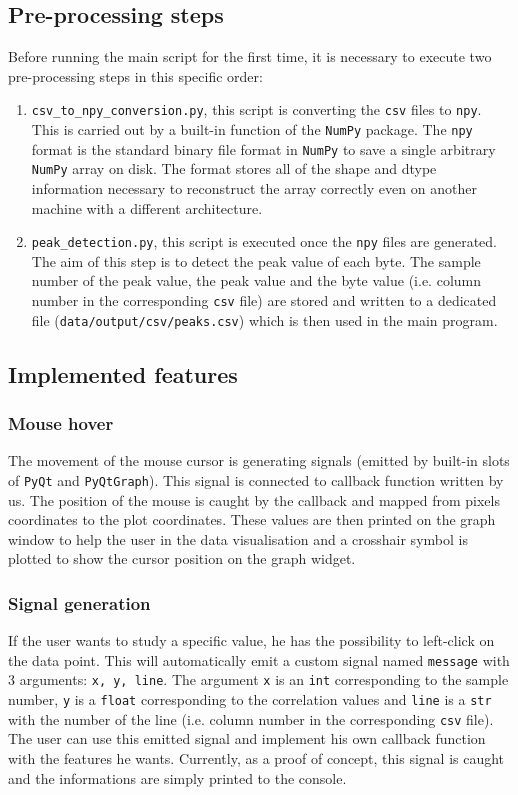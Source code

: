 \documentclass[11pt,a4paper]{article}
\begin{document}
\subsection{Pre-processing steps}
Before running the main script for the first time, it is necessary to execute two pre-processing steps in this specific order:
\begin{enumerate}
    \item \texttt{csv\_to\_npy\_conversion.py}, this script is converting the \texttt{csv} files to \texttt{npy}. This is carried out by a built-in function of the \texttt{NumPy} package. The \texttt{npy} format is the standard binary file format in \texttt{NumPy} to save a single arbitrary \texttt{NumPy} array on disk. The format stores all of the shape and dtype information necessary to reconstruct the array correctly even on another machine with a different architecture.
    \item \texttt{peak\_detection.py}, this script is executed once the \texttt{npy} files are generated. The aim of this step is to detect the peak value of each byte. The sample number of the peak value, the peak value and the byte value (i.e. column number in the corresponding \texttt{csv} file) are stored and written to a dedicated file (\texttt{data/output/csv/peaks.csv}) which is then used in the main program.
\end{enumerate}

\subsection{Implemented features}
\subsubsection{Mouse hover}
The movement of the mouse cursor is generating signals (emitted by built-in slots of \texttt{PyQt} and \texttt{PyQtGraph}). This signal is connected to callback function written by us. The position of the mouse is caught by the callback and mapped from pixels coordinates to the plot coordinates. These values are then printed on the graph window to help the user in the data visualisation and a crosshair symbol is plotted to show the cursor position on the graph widget.

\subsubsection{Signal generation}
If the user wants to study a specific value, he has the possibility to left-click on the data point. This will automatically emit a custom signal named \texttt{message} with 3 arguments: \texttt{x, y, line}. The argument \texttt{x} is an \texttt{int} corresponding to the sample number, \texttt{y} is a \texttt{float} corresponding to the correlation values and \texttt{line} is a \texttt{str} with the number of the line (i.e. column number in the corresponding \texttt{csv} file). The user can use this emitted signal and implement his own callback function with the features he wants. Currently, as a proof of concept, this signal is caught and the informations are simply printed to the console.
\end{document}
